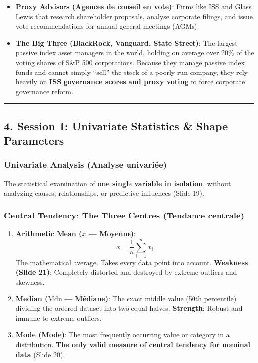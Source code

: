 \documentclass[
]{article}
\providecommand{\tightlist}{%
  \setlength{\itemsep}{0pt}\setlength{\parskip}{0pt}}
\begin{document}
\begin{itemize}
\tightlist
\item
  \textbf{Proxy Advisors (Agences de conseil en vote)}: Firms like ISS
  and Glass Lewis that research shareholder proposals, analyse corporate
  filings, and issue vote recommendations for annual general meetings
  (AGMs).
\item
  \textbf{The Big Three (BlackRock, Vanguard, State Street)}: The
  largest passive index asset managers in the world, holding on average
  over 20\% of the voting shares of S\&P 500 corporations. Because they
  manage passive index funds and cannot simply ``sell'' the stock of a
  poorly run company, they rely heavily on \textbf{ISS governance scores
  and proxy voting} to force corporate governance reform.
\end{itemize}

\begin{center}\rule{0.5\linewidth}{0.5pt}\end{center}

\subsection{4. Session 1: Univariate Statistics \& Shape
Parameters}\label{session-1-univariate-statistics-shape-parameters}

\subsubsection{Univariate Analysis (Analyse
univariée)}\label{univariate-analysis-analyse-univariuxe9e}

The statistical examination of \textbf{one single variable in
isolation}, without analyzing causes, relationships, or predictive
influences (Slide 19).

\subsubsection{Central Tendency: The Three Centres (Tendance
centrale)}\label{central-tendency-the-three-centres-tendance-centrale}

\begin{enumerate}
\def\labelenumi{\arabic{enumi}.}
\tightlist
\item
  \textbf{Arithmetic Mean (\(\bar{x}\) --- Moyenne)}:
  \[\bar{x} = \frac{1}{n} \sum_{i=1}^n x_i\] The mathematical average.
  Takes every data point into account. \textbf{Weakness (Slide 21)}:
  Completely distorted and destroyed by extreme outliers and skewness.
\item
  \textbf{Median (\(\text{Mdn}\) --- Médiane)}: The exact middle value
  (50th percentile) dividing the ordered dataset into two equal halves.
  \textbf{Strength}: Robust and immune to extreme outliers.
\item
  \textbf{Mode (Mode)}: The most frequently occurring value or category
  in a distribution. \textbf{The only valid measure of central tendency
  for nominal data} (Slide 20).
\end{enumerate}
\end{document}
